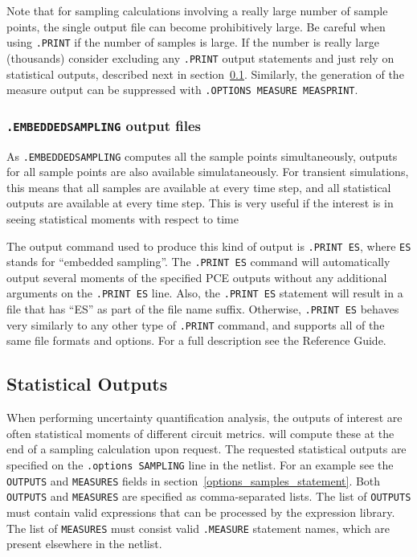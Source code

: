 Note that for sampling calculations involving a really large number of sample 
points, the single output file can become prohibitively large.  Be careful when 
using \verb|.PRINT| if the number of samples is large.   If the number is really 
large (thousands) consider excluding any \verb|.PRINT| output statements and 
just rely on statistical outputs, described next in section~\ref{statistical_outputs}.
Similarly, the generation of the measure output can be suppressed with 
\texttt{.OPTIONS MEASURE MEASPRINT}.

\subsubsection{\texttt{.EMBEDDEDSAMPLING} output files}

As \texttt{.EMBEDDEDSAMPLING} computes all the sample points simultaneously, outputs for all 
sample points are also available simulataneously.  For transient simulations, this means that 
all samples are available at every time step, and all statistical outputs are available 
at every time step.  This is very useful if the interest is in seeing statistical moments 
with respect to time   

The output command used to produce this kind of output is \texttt{.PRINT ES}, where \texttt{ES} 
stands for  ``embedded sampling''.
The \texttt{.PRINT ES} command will automatically output several moments of the 
specified PCE outputs without any additional arguments on the \texttt{.PRINT ES} line.  
Also, the \texttt{.PRINT ES} statement will result in a file that has ``ES'' as part of the file name suffix.
Otherwise, \texttt{.PRINT ES} behaves very similarly to any other type of \texttt{.PRINT} 
command, and supports all of the same file formats and options.  For a full description see the
\Xyce{} Reference Guide.

\subsection{Statistical Outputs}
\label{statistical_outputs}
When performing uncertainty quantification analysis, the outputs of interest are 
often statistical moments of different circuit metrics.   \Xyce{} will compute these at the
end of a sampling calculation upon request.  The requested statistical outputs are 
specified on the \texttt{.options SAMPLING} line in the netlist.  For an example 
see the \texttt{OUTPUTS} and \texttt{MEASURES} fields in section~\ref{options_samples_statement}.  
Both \texttt{OUTPUTS} and \texttt{MEASURES} are specified as comma-separated 
lists.  The list of \texttt{OUTPUTS} must contain valid expressions that can be 
processed by the \Xyce{} expression library.  The list of \texttt{MEASURES} must 
consist valid \texttt{.MEASURE} statement names, which are present elsewhere in 
the netlist.

